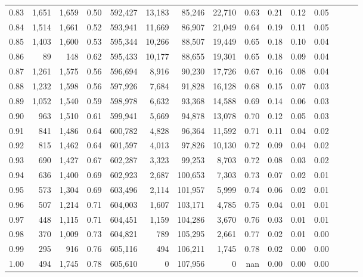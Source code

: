 \begin{tabular}{rrrrrrrrrrrrrrr}
0.83 &   1,651 &  1,659 &  0.50 &  592,427 &   13,183 &   85,246 &   22,710 &  0.63 &  0.21 &  0.12 &      0.05 \\
0.84 &   1,514 &  1,661 &  0.52 &  593,941 &   11,669 &   86,907 &   21,049 &  0.64 &  0.19 &  0.11 &      0.05 \\
0.85 &   1,403 &  1,600 &  0.53 &  595,344 &   10,266 &   88,507 &   19,449 &  0.65 &  0.18 &  0.10 &      0.04 \\
0.86 &      89 &    148 &  0.62 &  595,433 &   10,177 &   88,655 &   19,301 &  0.65 &  0.18 &  0.09 &      0.04 \\
0.87 &   1,261 &  1,575 &  0.56 &  596,694 &    8,916 &   90,230 &   17,726 &  0.67 &  0.16 &  0.08 &      0.04 \\
0.88 &   1,232 &  1,598 &  0.56 &  597,926 &    7,684 &   91,828 &   16,128 &  0.68 &  0.15 &  0.07 &      0.03 \\
0.89 &   1,052 &  1,540 &  0.59 &  598,978 &    6,632 &   93,368 &   14,588 &  0.69 &  0.14 &  0.06 &      0.03 \\
0.90 &     963 &  1,510 &  0.61 &  599,941 &    5,669 &   94,878 &   13,078 &  0.70 &  0.12 &  0.05 &      0.03 \\
0.91 &     841 &  1,486 &  0.64 &  600,782 &    4,828 &   96,364 &   11,592 &  0.71 &  0.11 &  0.04 &      0.02 \\
0.92 &     815 &  1,462 &  0.64 &  601,597 &    4,013 &   97,826 &   10,130 &  0.72 &  0.09 &  0.04 &      0.02 \\
0.93 &     690 &  1,427 &  0.67 &  602,287 &    3,323 &   99,253 &    8,703 &  0.72 &  0.08 &  0.03 &      0.02 \\
0.94 &     636 &  1,400 &  0.69 &  602,923 &    2,687 &  100,653 &    7,303 &  0.73 &  0.07 &  0.02 &      0.01 \\
0.95 &     573 &  1,304 &  0.69 &  603,496 &    2,114 &  101,957 &    5,999 &  0.74 &  0.06 &  0.02 &      0.01 \\
0.96 &     507 &  1,214 &  0.71 &  604,003 &    1,607 &  103,171 &    4,785 &  0.75 &  0.04 &  0.01 &      0.01 \\
0.97 &     448 &  1,115 &  0.71 &  604,451 &    1,159 &  104,286 &    3,670 &  0.76 &  0.03 &  0.01 &      0.01 \\
0.98 &     370 &  1,009 &  0.73 &  604,821 &      789 &  105,295 &    2,661 &  0.77 &  0.02 &  0.01 &      0.00 \\
0.99 &     295 &    916 &  0.76 &  605,116 &      494 &  106,211 &    1,745 &  0.78 &  0.02 &  0.00 &      0.00 \\
1.00 &     494 &  1,745 &  0.78 &  605,610 &        0 &  107,956 &        0 &   nan &  0.00 &  0.00 &      0.00 \\
\bottomrule
\end{tabular}

